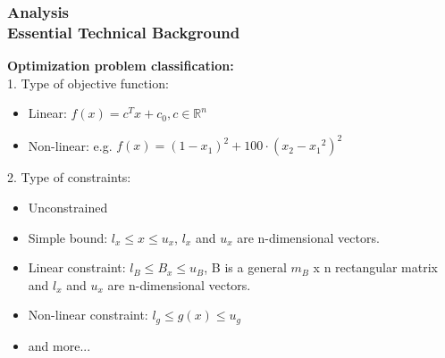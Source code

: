 \documentclass[ucs,10pt]{beamer}
\begin{document}
\begin{frame}
\frametitle{Analysis \\
\small \color{rwth-blue} Essential Technical Background}
\textbf{Optimization problem classification:}\\ \vspace{2ex}
1. Type of objective function:
	\begin{itemize}
	\item Linear: ${\displaystyle f(x) = c^T x + c_0 , c  \in \mathbb{R}^n}$
	\item Non-linear: e.g. ${\displaystyle f(x)=(1-{x_1})^2+100 \cdot ({x_2}-{x_1}^2)^2}$
	\end{itemize}
\vspace{1em}
2. Type of constraints: 
	\begin{itemize}
	\item Unconstrained
	\item Simple bound: ${\displaystyle l_x \leq x \leq u_x}$, ${\displaystyle l_x }$ and ${\displaystyle u_x}$ are n-dimensional vectors.
	\item Linear constraint: ${\displaystyle l_B \leq B_x \leq u_B}$, B is a general ${\displaystyle m_B}$ x n rectangular matrix and ${\displaystyle l_x }$ and ${\displaystyle u_x}$ are n-dimensional vectors.
	\item Non-linear constraint: ${\displaystyle  l_g \leq g(x) \leq u_g}$
	\item and more...
	\end{itemize}
\end{frame}
\end{document}

